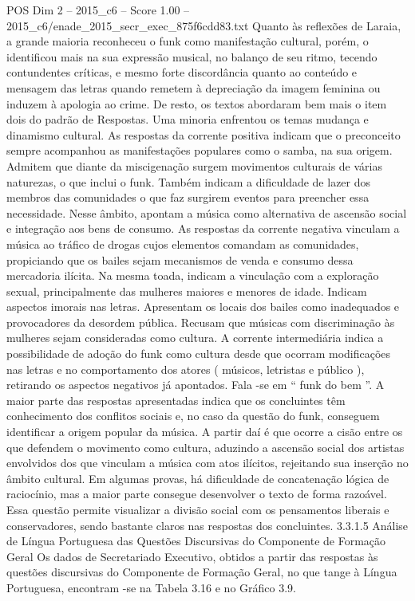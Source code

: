 \begin{textsample}{POS Dim 2 – 2015\_c6 – Score 1.00 – 2015\_c6/enade\_2015\_secr\_exec\_875f6cdd83.txt}
Quanto às reflexões de Laraia, a grande maioria reconheceu o funk como manifestação cultural, porém, o identificou mais na sua expressão musical, no balanço de seu ritmo, tecendo contundentes críticas, e mesmo forte discordância quanto ao conteúdo e mensagem das letras quando remetem à depreciação da imagem feminina ou induzem à apologia ao crime.
De resto, os textos abordaram bem mais o item dois do padrão de Respostas.
Uma minoria enfrentou os temas mudança e dinamismo cultural.
As respostas da corrente positiva indicam que o preconceito sempre acompanhou as manifestações populares como o samba, na sua origem.
Admitem que diante da miscigenação surgem movimentos culturais de várias naturezas, o que inclui o funk.
Também indicam a dificuldade de lazer dos membros das comunidades o que faz surgirem eventos para preencher essa necessidade.
Nesse âmbito, apontam a música como alternativa de ascensão social e integração aos bens de consumo.
As respostas da corrente negativa vinculam a música ao tráfico de drogas cujos elementos comandam as comunidades, propiciando que os bailes sejam mecanismos de venda e consumo dessa mercadoria ilícita.
Na mesma toada, indicam a vinculação com a exploração sexual, principalmente das mulheres maiores e menores de idade.
Indicam aspectos imorais nas letras.
Apresentam os locais dos bailes como inadequados e provocadores da desordem pública.
Recusam que músicas com discriminação às mulheres sejam consideradas como cultura.
A corrente intermediária indica a possibilidade de adoção do funk como cultura desde que ocorram modificações nas letras e no comportamento dos atores ( músicos, letristas e público ), retirando os aspectos negativos já apontados.
Fala -se em “ funk do bem ”.
A maior parte das respostas apresentadas indica que os concluintes têm conhecimento dos conflitos sociais e, no caso da questão do funk, conseguem identificar a origem popular da música.
A partir daí é que ocorre a cisão entre os que defendem o movimento como cultura, aduzindo a ascensão social dos artistas envolvidos dos que vinculam a música com atos ilícitos, rejeitando sua inserção no âmbito cultural.
Em algumas provas, há dificuldade de concatenação lógica de raciocínio, mas a maior parte consegue desenvolver o texto de forma razoável.
Essa questão permite visualizar a divisão social com os pensamentos liberais e conservadores, sendo bastante claros nas respostas dos concluintes. 3.3.1.5 Análise de Língua Portuguesa das Questões Discursivas do Componente de Formação Geral Os dados de Secretariado Executivo, obtidos a partir das respostas às questões discursivas do Componente de Formação Geral, no que tange à Língua Portuguesa, encontram -se na Tabela 3.16 e no Gráfico 3.9.

\end{textsample}
